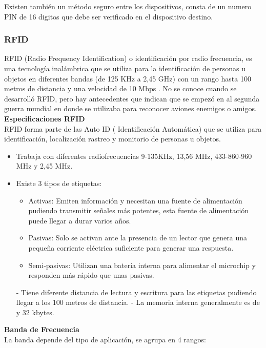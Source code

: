 \documentclass[11pt,openany]{book}
\newcounter{ns}
\begin{document}
		Existen también un método seguro entre los dispositivos, consta de un numero PIN de 16 digitos que debe ser verificado en el dispositivo destino.

	\subsubsection{RFID}
	RFID (Radio Frequency Identification) o identificación por radio frecuencia, es una tecnología inalámbrica que se utiliza para la identificación de personas u objetos en diferentes bandas (de 125 KHz a 2,45 GHz) con un rango hasta 100 metros de distancia y una velocidad de 10 Mbps \cite{Cherrez2010,Chavarria2011,pdf2}. No se conoce cuando se desarrolló RFID, pero hay antecedentes que indican que se empezó en al segunda guerra mundial en donde se utilizaba para reconocer aviones enemigos o amigos.\\[0.25cm]
	\textbf{Especificaciones RFID}\\[0.25cm]
	RFID forma parte de las Auto ID ( Identificación Automática) que se utiliza para identificación, localización rastreo y monitorio de personas u objetos.
		\begin{itemize}
	\item Trabaja con diferentes radiofrecuencias 9-135KHz, 13,56 MHz, 433-860-960 MHz y 2,45 MHz.
	\item Existe 3 tipos de etiquetas:
		\begin{itemize}
			\item Activas: Emiten información y necesitan una fuente de alimentación pudiendo transmitir señales más potentes, esta fuente de alimentación puede llegar a durar varios años.
			\item Pasivas: Solo se activan ante la presencia de un lector que genera una pequeña corriente eléctrica suficiente para generar una respuesta.
			\item Semi-pasivas: Utilizan una batería interna para alimentar el microchip y responden más rápido que unas pasivas.
		\end{itemize}
-	Tiene diferente distancia de lectura y escritura para las etiquetas pudiendo llegar a los 100 metros de distancia.
-	La memoria interna generalmente es de y 32 kbytes.
	\end{itemize}

	\textbf{Banda de Frecuencia}\\[0.25cm]
	La banda depende del tipo de aplicación, se agrupa en 4 rangos:
	\newpage
\end{document}
